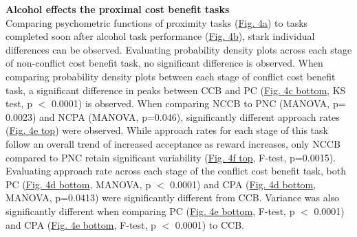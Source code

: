 \documentclass{article}
\begin{document}
\noindent\textbf{Alcohol effects the proximal cost benefit tasks}\\
Comparing psychometric functions of proximity tasks (\hyperref[fig:alcohol_main_4]{Fig. 4a}) to tasks completed soon after alcohol task performance (\hyperref[fig:alcohol_main_4]{Fig. 4b}), stark individual differences can be observed. Evaluating probability density plots across each stage of non-conflict cost benefit task, no significant difference is observed. When comparing probability density plots between each stage of conflict cost benefit task, a significant difference in peaks between CCB and PC (\hyperref[fig:alcohol_main_4]{Fig. 4c bottom}, KS test, p $<$ 0.0001) is observed. When comparing NCCB to PNC (MANOVA, p= 0.0023) and NCPA (MANOVA, p=0.046), significantly different approach rates (\hyperref[fig:alcohol_main_4]{Fig. 4e top}) were observed. While approach rates for each stage of this task follow an overall trend of increased acceptance as reward increases, only NCCB compared to PNC retain significant variability (\hyperref[fig:alcohol_main_4]{Fig. 4f top}, F-test, p=0.0015). Evaluating approach rate across each stage of the conflict cost benefit task, both PC (\hyperref[fig:alcohol_main_4]{Fig. 4d bottom}, MANOVA, p $<$ 0.0001) and CPA (\hyperref[fig:alcohol_main_4]{Fig. 4d bottom}, MANOVA, p=0.0413) were significantly different from CCB. Variance was also significantly different when comparing PC (\hyperref[fig:alcohol_main_4]{Fig. 4e bottom}, F-test, p $<$ 0.0001) and CPA (\hyperref[fig:alcohol_main_4]{Fig. 4e bottom}, F-test, p $<$ 0.0001) to CCB.
\end{document}
